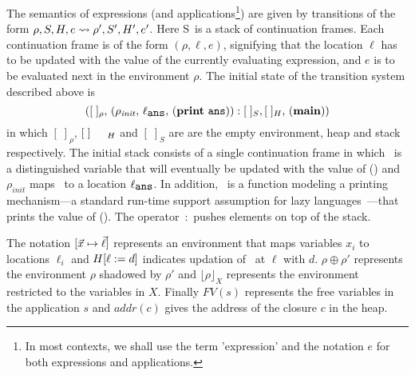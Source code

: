 \documentclass[preprint, 9pt]{sigplanconf}
\newcommand{\warning}[1]{{\color{Myred}{#1}}}
\def\myvec{\mathaccent"017E }
\newcommand{\stk}{{S}}
\begin{document}
The  semantics  of   expressions  (and  applications\footnote{In  most
 contexts, we  shall use the  term 'expression' and the  notation $e$
  for both expressions and applications.}) 
are given by transitions of the form $\rho, \stk, \heap, e \rightsquigarrow
\rho',  \stk', \heap',  e'$.  Here  \stk\ is  a stack  of continuation
frames.  Each  continuation frame  is of the  form $(\rho,  \ell, e)$,
signifying that the  location $\ell$ has to be updated  with the value
of the  currently evaluating  expression, and $e$  is to  be evaluated
next  in the  environment $\rho$.  
The  initial  state  of  the  transition  system  described  above  is
\[([\;]_\rho,\,     (\rho_\mathit{init},     \,    \ell_{\mathbf{\mbox{\tt ans}}}     ,\,
(\mathbf{print}~\mathbf{\mbox{\tt ans}})):[\;]_{S},   [\;]_{H},\,   (\mathbf{main}))\]  in   which
$[\;]_\rho$, $[\;]_{\mbox  \footnotesize {H}}$ and $[\;]_{S}$  are are
the empty environment, heap and  stack respectively. The initial stack
consists  of  a  single  continuation   frame  in  which  \ans\  is  a
distinguished variable that will eventually  be updated with the value
of  (\mainpgm)  and  $\rho_\mathit{init}$  maps \ans\  to  a  location
$\ell_{\mathbf{\mbox{\tt ans}}}$.  In addition, \print\ is a function modeling a printing
mechanism---a   standard   run-time   support  assumption   for   lazy
languages~\cite{Jones87}---that prints  the value of  (\mainpgm).  The
operator~$:$ pushes elements on top of the stack.

The   notation  $[\myvec{x}   \mapsto  \myvec{\ell}]$   represents  an
environment  that  maps  variables  $x_i$ to  locations  $\ell_i$  and
$H[\ell := d]$  indicates updation of  \heap\ at $\ell$
with  $d$.   $\rho \oplus  \rho'$  represents  the environment  $\rho$
shadowed  by  $\rho'$  and  $\lfloor \rho  \rfloor_X$  represents  the
environment  restricted  to  the  variables in  $X$.  Finally  $FV(s)$
represents the  free variables  in the  application $s$  and $addr(c)$
gives the address of the closure $c$ in the heap.
\end{document}
